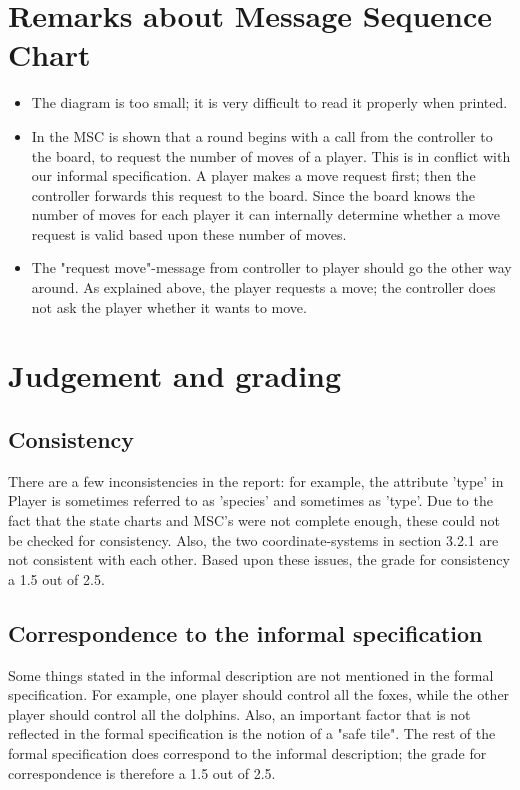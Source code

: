 \documentclass[a4paper,11pt]{article}
\begin{document}
    \section{Remarks about Message Sequence Chart}
    \begin{itemize}
        \item The diagram is too small; it is very difficult to read it properly when printed.
        \item In the MSC is shown that a round begins with a call from the controller to the board, to request the number of moves of a player. This is in conflict with our informal specification. A player makes a move request first; then the controller forwards this request to the board. Since the board knows the number of moves for each player it can internally determine whether a move request is valid based upon these number of moves.
        \item The "request move"-message from controller to player should go the other way around. As explained above, the player requests a move; the controller does not ask the player whether it wants to move.
    \end{itemize}

    \section{Judgement and grading}
    \subsection{Consistency}
    There are a few inconsistencies in the report: for example, the attribute 'type' in Player is sometimes referred to as 'species' and sometimes as 'type'. Due to the fact that the state charts and MSC's were not complete enough, these could not be checked for consistency. Also, the two coordinate-systems in section 3.2.1 are not consistent with each other. Based upon these issues, the grade for consistency a 1.5 out of 2.5.\\

    \subsection{Correspondence to the informal specification}
     Some things stated in the informal description are not mentioned in the formal specification. For example, one player should control all the foxes, while the other player should control all the dolphins. Also, an important factor that is not reflected in the formal specification is the notion of a "safe tile". The rest of the formal specification does correspond to the informal description; the grade for correspondence is therefore a 1.5 out of 2.5. \\
    
\end{document}
